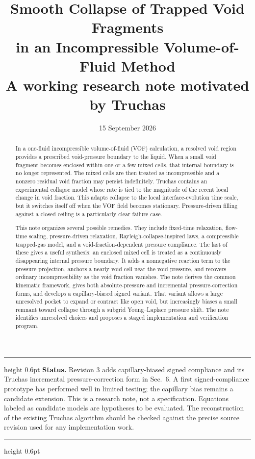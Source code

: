 \documentclass[11pt]{article}
\title{\vspace{-2.2em}\textbf{Smooth Collapse of Trapped Void Fragments\\
in an Incompressible Volume-of-Fluid Method}\\[0.6em]
\large A working research note motivated by Truchas}
\author{}
\date{15 September 2026}
\begin{document}
\maketitle
\vspace{-2.4em}

\begin{abstract}
In a one-fluid incompressible volume-of-fluid (VOF) calculation, a resolved void region
provides a prescribed void-pressure boundary to the liquid.  When a small void fragment
becomes enclosed within one or a few mixed cells, that internal boundary is no longer
represented.  The mixed cells are then treated as incompressible and a nonzero residual
void fraction may persist indefinitely.  Truchas contains an experimental collapse model
whose rate is tied to the magnitude of the recent local change in void fraction.  This
adapts collapse to the local interface-evolution time scale, but it switches itself off
when the VOF field becomes stationary.  Pressure-driven filling against a closed ceiling
is a particularly clear failure case.

This note organizes several possible remedies.  They include fixed-time relaxation,
flow-time scaling, pressure-driven relaxation, Rayleigh-collapse-inspired laws, a
compressible trapped-gas model, and a void-fraction-dependent pressure compliance.  The
last of these gives a useful synthesis: an enclosed mixed cell is treated as a
continuously disappearing internal pressure boundary.  It adds a nonnegative reaction
term to the pressure projection, anchors a nearly void cell near the void pressure, and
recovers ordinary incompressibility as the void fraction vanishes.  The note derives the
common kinematic framework, gives both absolute-pressure and incremental
pressure-correction forms, and develops a capillary-biased signed variant.  That variant
allows a large unresolved pocket to expand or contract like open void, but increasingly
biases a small remnant toward collapse through a subgrid Young--Laplace pressure shift.
The note identifies unresolved choices and proposes a staged implementation and
verification program.
\end{abstract}

\hrule height 0.6pt
\vspace{0.4em}
\textbf{Status.} Revision 3 adds capillary-biased signed compliance and its Truchas
incremental pressure-correction form in Sec.~6.  A first signed-compliance prototype has
performed well in limited testing; the capillary bias remains a candidate extension.
This is a research note, not a specification.  Equations labeled as
candidate models are hypotheses to be evaluated.  The reconstruction of the existing
Truchas algorithm should be checked against the precise source revision used for any
implementation work.
\vspace{0.4em}
\hrule height 0.6pt
\end{document}
